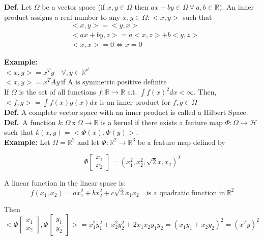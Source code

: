 \documentclass[11pt, english]{article}
\begin{document}
\textbf{Def.} Let $\Omega$ be a vector space (if $x, y \in \Omega$ then $ax + by \in \Omega \ \forall \ a,b \in \mathbb{R})$. An inner product assigns a real number to any $x,y \in \Omega: <x,y>$ such that
\begin{align}
	&<x,y> = <y,x>\\
	&<ax + by, z> = a<x,z> + b<y, z>\\
	&<x,x> = 0 \Leftrightarrow x = 0
\end{align}

\textbf{Example:}\\

$<x,y> = x^Ty \quad \forall ,y \in \mathbb{R}^d$\\

$<x,y> = x^TAy \ \text{if A is symmetric positive definite}$\\

If $\Omega$ is the set of all functions $f: \mathbb{R} \rightarrow \mathbb{R}$ s.t. $\int f(x)^2 dx < \infty$. Then,\\

$<f,g> = \int f(x) g(x) dx$ is an inner product for $f, g \in \Omega$\\

\textbf{Def.} A complete vector space with an inner product is called a Hilbert Space.\\

\textbf{Def.}\ A function $k : \Omega \ \text{x}\ \Omega \rightarrow \mathbb{R}$ is a kernel if there exists a feature map $\Phi : \Omega \rightarrow \mathcal{H}$ such that $k(x,y) = <\Phi(x), \Phi(y)>$.\\

\textbf{Example:} Let $\Omega = \mathbb{R}^2$ and let $\Phi : \mathbb{R}^2 \rightarrow \mathbb{R}^3$ be a feature map defined by

$$
\Phi \begin{bmatrix}
x_1 \\
x_2
\end{bmatrix} = (x^2_1, x^2_2, \sqrt{2}x_1x_2)^T
$$



A linear function in the linear space is:
$$f(x_1,x_2) = ax^2_1 + bx^2_2 + c\sqrt{2}x_1x_2 \quad \text{is a quadratic function in}\ \mathbb{R}^2$$

Then $<\Phi\begin{bmatrix}
x_1 \\
x_2
\end{bmatrix}, \Phi\begin{bmatrix}
y_1 \\
y_2
\end{bmatrix}> = x^2_1y_1^2 + x_2^2y_2^2 + 2x_1x_2y_1y_2 = (x_1y_1 + x_2y_2)^2 = (x^Ty)^2$
\end{document}
